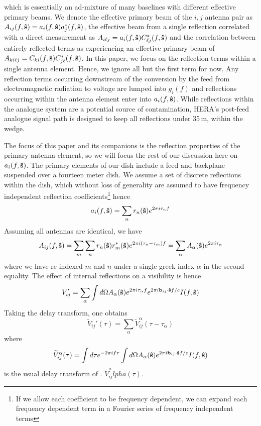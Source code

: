 \documentclass[twocolumn]{emulateapj}
\begin{document}
which is essentially an ad-mixture of many baselines with different effective primary beams. We denote the effective primary beam of the $i,j$ antenna pair as $A_{ij}(f,{\bf \hat{s}})=a_i(f,{\bf \hat{s}})a_j^*(f,{\bf \hat{s}})$, the effective beam from a single reflection correlated with a direct measurement as $A_{i \ell j} = a_i(f,{\bf \hat{s}}) C^*_{\ell j}(f,{\bf \hat{s}})$ and the correlation between entirely reflected terms as experiencing an effective primary beam of $A_{k i \ell j}=C_{ki}(f,{\bf \hat{s}}) C^*_{j \ell}(f,{\bf \hat{s}})$. In this paper, we focus on the reflection terms within a single antenna element. Hence, we ignore all but the first term for now. Any reflection terms occurring downstream of the conversion by the feed from electromagnetic radiation to voltage are lumped into $g_i(f)$ and reflections occurring within the antenna element enter into $a_i(f,{\bf \hat{s}})$. While reflections within the analogue system are a potential source of contamination, HERA's post-feed analogue signal path is designed to keep all reflections under 35\,m, within the wedge. 

The focus of this paper and its companions is the reflection properties of the primary antenna element, so we will focus the rest of our discussion here on $a_i(f,{\bf \hat{s}})$. The primary elements of our dish include a feed and backplane suspended over a fourteen meter dish. We assume a set of discrete reflections within the dish, which without loss of generality are assumed to have frequency independent reflection coefficients\footnote{If we allow each coefficient to be frequency dependent, we can expand each frequency dependent term in a Fourier series of frequency independent terms} hence 
\begin{equation}
a_i(f,{\bf \hat{s}}) = \sum_{n} r_n({\bf \hat{s}}) e^{2 \pi i  \tau_n f}
\end{equation}
Assuming all antennas are identical, we have
\begin{equation}
A_{ij}(f,{\bf \hat{s}}) = \sum_m \sum_n r_n({\bf \hat{s}}) r_m^*({\bf \hat{s}}) e^{2 \pi i(\tau_n-\tau_m)f} = \sum_\alpha A_\alpha({\bf \hat{s}}) e^{2 \pi i \tau_\alpha}
\end{equation}
where we have re-indexed $m$ and $n$ under a single greek index $\alpha$ in the second equality. The effect of internal reflections on a visibility is hence
\begin{equation}
V_{ij}'= \sum_\alpha \int d \Omega A_\alpha({\bf \hat{s}}) e^{2 \pi i \tau_\alpha f} e^{2 \pi i {\bf b}_{ij} \cdot {\bf \hat{s}}f/c} I(f,{\bf \hat{s}})
\end{equation}
Taking the delay transform, one obtains
\begin{equation}
\widetilde{V}_{ij}'(\tau) = \sum_\alpha \widetilde{V}_{ij}^\alpha (\tau - \tau_\alpha)
\end{equation}
where 
\begin{equation}
\widetilde{V}^\alpha_{ij}(\tau) = \int d \tau e^{-2 \pi i f \tau} \int d \Omega A_\alpha({\bf \hat{s}}) e^{2 \pi i {\bf b}_{ij} \cdot {\bf \hat{s}} f/c} I(f,{\bf \hat{s}})
\end{equation}
is the usual delay transform of \citet{Parsons:2012}. $\widetilde{V}_{ij}^alpha(\tau)$.
\end{document}

